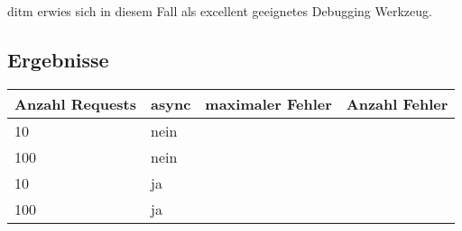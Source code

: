 \documentclass[a4paper]{report}
\begin{document}
ditm erwies sich in diesem Fall als excellent geeignetes Debugging Werkzeug.

\subsection{Ergebnisse}
\begin{table}[h]
	\begin{tabular}{|l|l|l|l|}
		\hline
		Anzahl Requests & async & maximaler Fehler & Anzahl Fehler \\ \hline
		10              & nein  &                  &               \\ \hline
		100             & nein  &                  &               \\ \hline
		10              & ja    &                  &               \\ \hline
		100             & ja    &                  &               \\ \hline
	\end{tabular}
\end{table}
\end{document}
